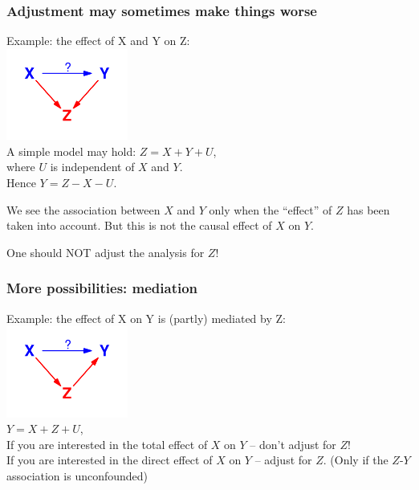 \documentclass{beamer}
\begin{document}
\begin{frame}
\frametitle{Adjustment may sometimes make things worse}
Example: the effect of X and Y on  Z:   \\[-0.2cm]
\includegraphics[width=4cm]{wrongadjust}\\[-0.3cm]
A simple model may hold:
$Z = X + Y + U$, \\
where $U$ is independent of $X$ and $Y$. \\
Hence $Y = Z - X - U$.

\pause
\alert<1>{We see the association between $X$ and $Y$ only when the ``effect'' of  $Z$ has been taken into account.
But this is not the causal effect of $X$ on $Y$.}

\alert<2>{One should NOT adjust the analysis for $Z$!}
\end{frame}

\begin{frame}
\frametitle{More possibilities: mediation}
Example: the effect of X on Y is (partly) \alert{mediated} by  Z:   \\[-0.2cm]
\includegraphics[width=4cm]{mediation}\\[-0.3cm]

$Y = X + Z + U$, \\

\pause
If you are interested in the \alert{total effect} of $X$ on $Y$ -- don't adjust for $Z$! \\

\pause
If you are interested in the \alert{direct effect} of $X$ on $Y$ -- adjust for $Z$. (Only if the $Z$-$Y$ association is unconfounded)
\end{frame}

\end{document}

